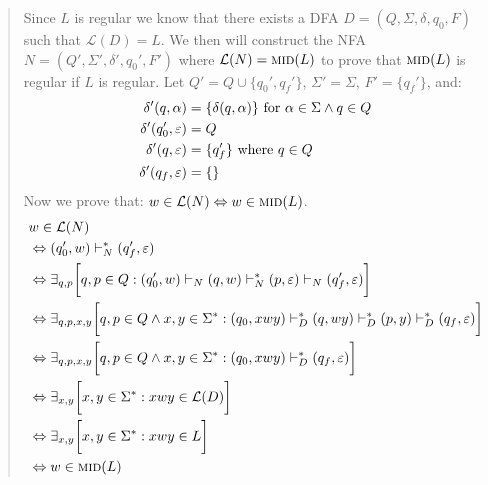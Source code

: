     \begin{quote}
        Since $L$ is regular we know that there exists a DFA $D = (Q, \Sigma, \delta, q_0, F)$ such that $\mathcal{L}(D)=L$. We then will construct the NFA $N = (Q', \Sigma', \delta', q_0', F')$ where $\mathcal{L}(N) = \textsc{mid}(L)$ to prove that $\textsc{mid}(L)$ is regular if $L$ is regular.
        \bigskip
        Let $Q' = Q \cup \{ q_0', q_f' \}$, $\Sigma' = \Sigma$, $F' = \{ q_f' \}$, and:
        \begin{align}
               \delta'(q, \alpha) &= \{ \delta(q, \alpha) \} \text{ for } \alpha\in\Sigma \wedge q \in Q
            \\ \delta'(q_0', \varepsilon) &= Q 
            \\ \delta'(q, \varepsilon) &= \{ q_f' \} \text{ where }q \in Q
            \\ \delta'(q_f, \varepsilon) &= \{ \}
        \end{align}
        Now we prove that: $w\in\mathcal{L}(N) \Leftrightarrow w\in\textsc{mid}(L)$.
        \begin{align}
            &w\in\mathcal{L}(N)
            \\&\Leftrightarrow (q_0', w)\vdash^*_N(q_f', \varepsilon)
            \\&\Leftrightarrow \exists_{q, p}\bigg[ 
                q, p \in Q :
                (q_0', w) \vdash_N (q, w) \vdash_N^* (p, \varepsilon) \vdash_N (q_f', \varepsilon) 
            \bigg]
            \\&\Leftrightarrow \exists_{q, p, x, y}\bigg[ 
                q, p \in Q \wedge x, y \in \Sigma^* :
                (q_0, xwy) \vdash_D^* (q, wy) \vdash_D^* (p, y) \vdash_D^* (q_f, \varepsilon) 
            \bigg]
            \\&\Leftrightarrow \exists_{q, p, x, y}\bigg[ 
                q, p \in Q \wedge x, y \in \Sigma^* :
                (q_0, xwy) \vdash_D^* (q_f, \varepsilon) 
            \bigg]
            \\&\Leftrightarrow \exists_{x, y}\bigg[ 
                x, y \in \Sigma^* : 
                xwy \in \mathcal{L}(D)
            \bigg]
            \\&\Leftrightarrow \exists_{x, y}\bigg[ 
                x, y \in \Sigma^* : 
                xwy \in L
            \bigg]
            \\&\Leftrightarrow w\in\textsc{mid}(L)    
        \end{align}
    \end{quote}
\newpage
